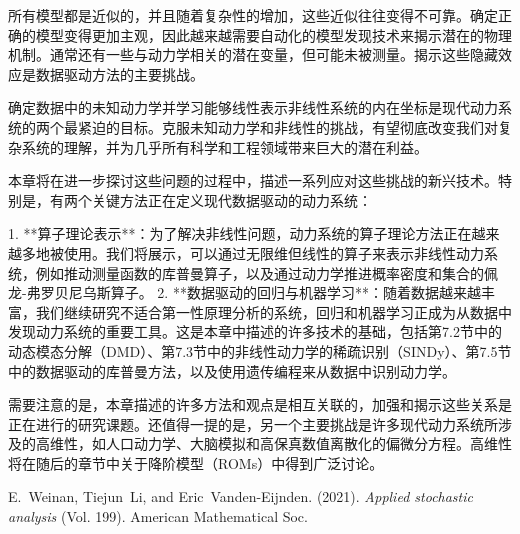 \documentclass{ctexart}
\begin{document}
所有模型都是近似的，并且随着复杂性的增加，这些近似往往变得不可靠。确定正确的模型变得更加主观，因此越来越需要自动化的模型发现技术来揭示潜在的物理机制。通常还有一些与动力学相关的潜在变量，但可能未被测量。揭示这些隐藏效应是数据驱动方法的主要挑战。

确定数据中的未知动力学并学习能够线性表示非线性系统的内在坐标是现代动力系统的两个最紧迫的目标。克服未知动力学和非线性的挑战，有望彻底改变我们对复杂系统的理解，并为几乎所有科学和工程领域带来巨大的潜在利益。

本章将在进一步探讨这些问题的过程中，描述一系列应对这些挑战的新兴技术。特别是，有两个关键方法正在定义现代数据驱动的动力系统：

1. **算子理论表示**：为了解决非线性问题，动力系统的算子理论方法正在越来越多地被使用。我们将展示，可以通过无限维但线性的算子来表示非线性动力系统，例如推动测量函数的库普曼算子，以及通过动力学推进概率密度和集合的佩龙-弗罗贝尼乌斯算子。
2. **数据驱动的回归与机器学习**：随着数据越来越丰富，我们继续研究不适合第一性原理分析的系统，回归和机器学习正成为从数据中发现动力系统的重要工具。这是本章中描述的许多技术的基础，包括第7.2节中的动态模态分解（DMD）、第7.3节中的非线性动力学的稀疏识别（SINDy）、第7.5节中的数据驱动的库普曼方法，以及使用遗传编程来从数据中识别动力学。

需要注意的是，本章描述的许多方法和观点是相互关联的，加强和揭示这些关系是正在进行的研究课题。还值得一提的是，另一个主要挑战是许多现代动力系统所涉及的高维性，如人口动力学、大脑模拟和高保真数值离散化的偏微分方程。高维性将在随后的章节中关于降阶模型（ROMs）中得到广泛讨论。




\begin{thebibliography}{}

 E.~Weinan, Tiejun~Li, and Eric~Vanden-Eijnden. (2021). \emph{Applied stochastic analysis} (Vol. 199). American Mathematical Soc.

\end{thebibliography}
\end{document}

